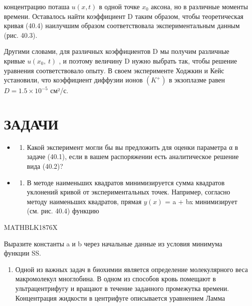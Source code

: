 \documentclass[
]{article}
\providecommand{\tightlist}{%
  \setlength{\itemsep}{0pt}\setlength{\parskip}{0pt}}
\begin{document}
концентрацию поташа \(u(x, t)\) в одной точке \(x_0\) аксона, но в
различные моменты времени. Оставалось найти коэффициент D таким образом,
чтобы теоретическая кривая (40.4) наилучшим образом соответствовала
экспериментальным данным (рис. 40.3).

Другими словами, для различных коэффициентов D мы получим различные
кривые \(u\left(x_{0},\ t\right)\) , и поэтому величину D нужно выбрать
так, чтобы решение уравнения соответствовало опыту. В своем эксперименте
Ходжкин и Кейс установили, что коэффициент диффузии ионов \((K^{+})\) в
экзоплазме равен \(D=1.5\times10^{-5}\) см²/с.

\section{ЗАДАЧИ}\label{ux437ux430ux434ux430ux447ux438-18}

\begin{itemize}
\tightlist
\item
  \begin{enumerate}
  \def\labelenumi{\arabic{enumi}.}
  \tightlist
  \item
    Какой эксперимент могли бы вы предложить для оценки параметра α в
    задаче (40.1), если в вашем распоряжении есть аналитическое решение
    вида (40.2)?
  \end{enumerate}
\item
  \begin{enumerate}
  \def\labelenumi{\arabic{enumi}.}
  \setcounter{enumi}{1}
  \tightlist
  \item
    В методе наименьших квадратов минимизируется сумма квадратов
    уклонений кривой от экспериментальных точек. Например, согласно
    методу наименьших квадратов, прямая \(y(x)\) = a + bx минимизирует
    (см. рис. 40.4) функцию
  \end{enumerate}
\end{itemize}

MATHBLK1876X

Выразите константы a и b через начальные данные из условия минимума
функции SS.

\begin{enumerate}
\def\labelenumi{\arabic{enumi}.}
\setcounter{enumi}{2}
\tightlist
\item
  Одной из важных задач в биохимии является определение молекулярного
  веса макромолекул многлобина. В одном из способов кровь помещают в
  ультрацентрифугу и вращают в течение заданного промежутка времени.
  Концентрация жидкости в центрифуге описывается уравнением Ламма
\end{enumerate}
\end{document}
